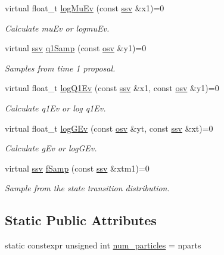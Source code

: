 \begin{DoxyCompactItemize}
virtual float\+\_\+t \hyperlink{classBSFilter_a460a1a2f97a5d1088a95f6b766e9dc56}{log\+Mu\+Ev} (const \hyperlink{classBSFilter_ad2341b982bcdabc798d7ed0f327d28f7}{ssv} \&x1)=0
\begin{DoxyCompactList}\small\item\em Calculate mu\+Ev or logmu\+Ev. \end{DoxyCompactList}\item 
virtual \hyperlink{classBSFilter_ad2341b982bcdabc798d7ed0f327d28f7}{ssv} \hyperlink{classBSFilter_a82185282cbc7ddf5983933ccd7705577}{q1\+Samp} (const \hyperlink{classBSFilter_a9a4da560f11a6e2d35ffe693de54826b}{osv} \&y1)=0
\begin{DoxyCompactList}\small\item\em Samples from time 1 proposal. \end{DoxyCompactList}\item 
virtual float\+\_\+t \hyperlink{classBSFilter_a81321d8ca9960ea4102c6fe3dc7b7636}{log\+Q1\+Ev} (const \hyperlink{classBSFilter_ad2341b982bcdabc798d7ed0f327d28f7}{ssv} \&x1, const \hyperlink{classBSFilter_a9a4da560f11a6e2d35ffe693de54826b}{osv} \&y1)=0
\begin{DoxyCompactList}\small\item\em Calculate q1\+Ev or log q1\+Ev. \end{DoxyCompactList}\item 
virtual float\+\_\+t \hyperlink{classBSFilter_a1cf2ed5153756a015384d459e72a57de}{log\+G\+Ev} (const \hyperlink{classBSFilter_a9a4da560f11a6e2d35ffe693de54826b}{osv} \&yt, const \hyperlink{classBSFilter_ad2341b982bcdabc798d7ed0f327d28f7}{ssv} \&xt)=0
\begin{DoxyCompactList}\small\item\em Calculate g\+Ev or log\+G\+Ev. \end{DoxyCompactList}\item 
virtual \hyperlink{classBSFilter_ad2341b982bcdabc798d7ed0f327d28f7}{ssv} \hyperlink{classBSFilter_ac97a15ea8002b48e56d94c8de699caa2}{f\+Samp} (const \hyperlink{classBSFilter_ad2341b982bcdabc798d7ed0f327d28f7}{ssv} \&xtm1)=0
\begin{DoxyCompactList}\small\item\em Sample from the state transition distribution. \end{DoxyCompactList}\end{DoxyCompactItemize}
\subsection*{Static Public Attributes}
\begin{DoxyCompactItemize}
\item 
static constexpr unsigned int \hyperlink{classBSFilter_a2a6b1e1870c1a4f3e7ca0b721b697ce2}{num\+\_\+particles} = nparts
\end{DoxyCompactItemize}
